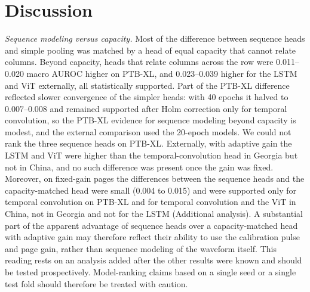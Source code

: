 \documentclass{wlscirep}
\begin{document}
\section*{Discussion}
\emph{Sequence modeling versus capacity.} Most of the difference between sequence heads and simple pooling was matched by a head of equal capacity that cannot relate columns. Beyond capacity, heads that relate columns across the row were 0.011--0.020 macro AUROC higher on PTB-XL, and 0.023--0.039 higher for the LSTM and ViT externally, all statistically supported. Part of the PTB-XL difference reflected slower convergence of the simpler heads: with 40 epochs it halved to 0.007--0.008 and remained supported after Holm correction only for temporal convolution, so the PTB-XL evidence for sequence modeling beyond capacity is modest, and the external comparison used the 20-epoch models. We could not rank the three sequence heads on PTB-XL. Externally, with adaptive gain the LSTM and ViT were higher than the temporal-convolution head in Georgia but not in China, and no such difference was present once the gain was fixed. Moreover, on fixed-gain pages the differences between the sequence heads and the capacity-matched head were small (0.004 to 0.015) and were supported only for temporal convolution on PTB-XL and for temporal convolution and the ViT in China, not in Georgia and not for the LSTM (Additional analysis). A substantial part of the apparent advantage of sequence heads over a capacity-matched head with adaptive gain may therefore reflect their ability to use the calibration pulse and page gain, rather than sequence modeling of the waveform itself. This reading rests on an analysis added after the other results were known and should be tested prospectively. Model-ranking claims based on a single seed or a single test fold should therefore be treated with caution.
\end{document}
